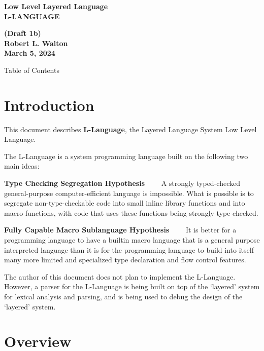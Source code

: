 \documentclass[12pt]{article}
\makeatletter
\renewcommand\tableofcontents{%
    \begin{list}{}%
	     {\setlength{\itemsep}{0in}%
	      \setlength{\topsep}{0in}%
	      \setlength{\parsep}{1ex}%
	      \setlength{\labelwidth}{0in}%
	      \setlength{\baselineskip}{1.5ex}%
	      \setlength{\leftmargin}{0.4in}%
	      \setlength{\rightmargin}{0.4in}}%
    \item\@starttoc{toc}%
    \end{list}}
\newcommand{\key}[1]{{\rm \bfseries #1}}
\newenvironment{indpar}[1][0.3in]%
	{\begin{list}{}%
		     {\setlength{\itemsep}{0in}%
		      \setlength{\topsep}{0in}%
		      \setlength{\parsep}{1ex}%
		      \setlength{\labelwidth}{#1}%
		      \setlength{\leftmargin}{#1}%
		      \addtolength{\leftmargin}{\labelsep}}%
	 \item}%
	{\end{list}}
\makeatother
\begin{document}
        
\begin{center}
\Large \bf
Low Level Layered Language\\[0.5ex]
\huge \bf
L-LANGUAGE
\end{center}
\begin{center}
\large \bf
(Draft 1b)
\\[0.5ex]
Robert L. Walton\\
March 5, 2024

\bigskip
 
Table of Contents
\end{center}

\bigskip

\tableofcontents 

\newpage

\section{Introduction}

This document describes \key{L-Language}, the Layered Language
System Low Level Language.

The L-Language is a system programming language built on the
following two main ideas:

\begin{indpar}

\key{Type Checking Segregation Hypothesis}~~~~ A strongly typed-checked
general-purpose computer-efficient language is impossible.
What is possible is
to segregate non-type-checkable code into small inline
library functions and into macro functions,
with code that uses these functions being
strongly type-checked.

\key{Fully Capable Macro Sublanguage Hypothesis}~~~~ It is better for
a programming language to have a builtin macro language that
is a general purpose interpreted language than it is for the
programming language to build into itself
many more limited and specialized type declaration and
flow control features.

\end{indpar}

The author of this document does not plan to implement the L-Language.
However, a parser for the L-Language is being built on top of the
`layered' system for lexical analysis and parsing, and is being used
to debug the design of the `layered' system.

\section{Overview}
\end{document}

